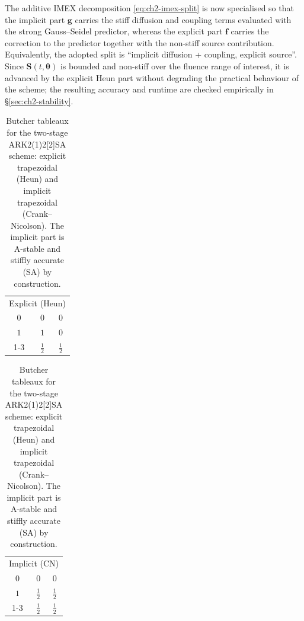 The additive IMEX decomposition \eqref{eq:ch2-imex-split} is now specialised so that the implicit part \(\mathbf{g}\) carries the stiff diffusion and coupling terms evaluated with the strong Gauss--Seidel predictor,
whereas the explicit part \(\mathbf{f}\) carries the correction to the predictor together with the non-stiff source contribution.
Equivalently, the adopted split is ``implicit diffusion + coupling, explicit source''.
Since \(\mathbf{S}(t,\boldsymbol{\theta})\) is bounded and non-stiff over the fluence range of interest,
it is advanced by the explicit Heun part without degrading the practical behaviour of the scheme;
the resulting accuracy and runtime are checked empirically in \S\ref{sec:ch2-stability}.

\begin{table}[htbp]
    \centering
    \caption{Butcher tableaux for the two-stage ARK2(1)2[2]SA scheme: explicit trapezoidal (Heun) and implicit trapezoidal (Crank--Nicolson). The implicit part is A-stable and stiffly accurate (SA) by construction. \cite{Ascher_1997,Kennedy_2003}}
    \label{tab:ch2-butcher}
    \begin{minipage}[t]{0.42\textwidth}
        \centering
        \begin{tabular}{@{}c|cc@{}}
            \multicolumn{3}{c}{Explicit (Heun)}               \\[0.5ex]
            $0$               & $0$           & $0$           \\
            $1$               & $1$           & $0$           \\
            \cline{1-3}
            \rule{0pt}{2.5ex} & $\frac{1}{2}$ & $\frac{1}{2}$
        \end{tabular}
    \end{minipage}
    \hfill
    \begin{minipage}[t]{0.42\textwidth}
        \centering
        \begin{tabular}{@{}c|cc@{}}
            \multicolumn{3}{c}{Implicit (CN)}                 \\[0.5ex]
            $0$               & $0$           & $0$           \\
            $1$               & $\frac{1}{2}$ & $\frac{1}{2}$ \\
            \cline{1-3}
            \rule{0pt}{2.5ex} & $\frac{1}{2}$ & $\frac{1}{2}$
        \end{tabular}
    \end{minipage}
\end{table}

